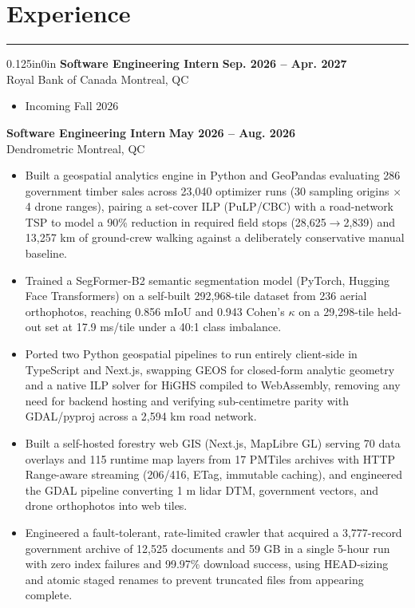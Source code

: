 \documentclass[11pt]{article}
\begin{document}
    \section*{\large Experience}
    \hrule 
    \vspace{0.4em}
    \begin{adjustwidth}{0.125in}{0in}
        \textbf{Software Engineering Intern} \hfill \textbf{Sep. 2026  -- Apr. 2027}\\
        Royal Bank of Canada \hfill Montreal, QC
        \begin{itemize}
            \item Incoming Fall 2026
        \end{itemize}
        \textbf{Software Engineering Intern} \hfill \textbf{May 2026  -- Aug. 2026}\\
        Dendrometric \hfill Montreal, QC
        \begin{itemize}
            \item Built a geospatial analytics engine in Python and GeoPandas evaluating 286 government timber sales across 23,040 optimizer runs (30 sampling origins $\times$ 4 drone ranges), pairing a set-cover ILP (PuLP/CBC) with a road-network TSP to model a 90\% reduction in required field stops (28,625$\rightarrow$2,839) and 13,257 km of ground-crew walking against a deliberately conservative manual baseline.
            \item Trained a SegFormer-B2 semantic segmentation model (PyTorch, Hugging Face Transformers) on a self-built 292,968-tile dataset from 236 aerial orthophotos, reaching 0.856 mIoU and 0.943 Cohen's $\kappa$ on a 29,298-tile held-out set at 17.9 ms/tile under a 40:1 class imbalance.
            \item Ported two Python geospatial pipelines to run entirely client-side in TypeScript and Next.js, swapping GEOS for closed-form analytic geometry and a native ILP solver for HiGHS compiled to WebAssembly, removing any need for backend hosting and verifying sub-centimetre parity with GDAL/pyproj across a 2,594 km road network.
            \item Built a self-hosted forestry web GIS (Next.js, MapLibre GL) serving 70 data overlays and 115 runtime map layers from 17 PMTiles archives with HTTP Range-aware streaming (206/416, ETag, immutable caching), and engineered the GDAL pipeline converting 1 m lidar DTM, government vectors, and drone orthophotos into web tiles.
            \item Engineered a fault-tolerant, rate-limited crawler that acquired a 3,777-record government archive of 12,525 documents and 59 GB in a single 5-hour run with zero index failures and 99.97\% download success, using HEAD-sizing and atomic staged renames to prevent truncated files from appearing complete.

\end{itemize}
\end{adjustwidth}
\end{document}
